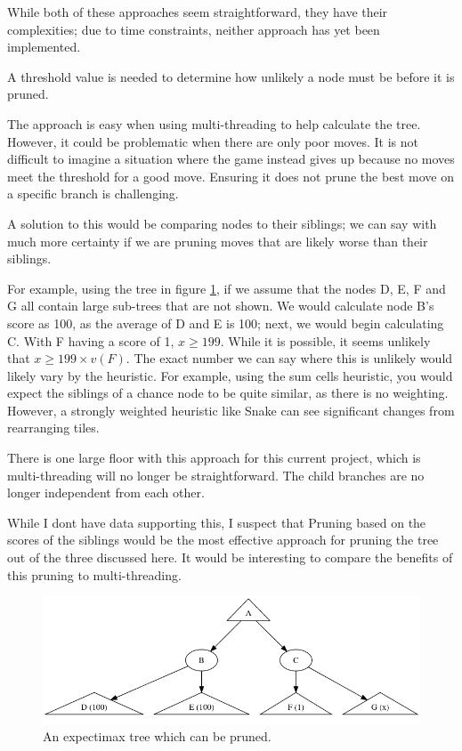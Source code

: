 \documentclass{article}
\begin{document}
While both of these approaches seem straightforward, they have their complexities; due to time constraints, neither approach has yet been implemented.

A threshold value is needed to determine how unlikely a node must be before it is pruned.

The approach is easy when using multi-threading to help calculate the tree. However, it could be problematic when there are only poor moves. It is not difficult to imagine a situation where the game instead gives up because no moves meet the threshold for a good move. Ensuring it does not prune the best move on a specific branch is challenging.

A solution to this would be comparing nodes to their siblings; we can say with much more certainty if we are pruning moves that are likely worse than their siblings.

For example, using the tree in figure \ref{fig:prunepmoves}, if we assume that the nodes D, E, F and G all contain large sub-trees that are not shown. We would calculate node B's score as 100, as the average of D and E is 100; next, we would begin calculating C. With F having a score of 1, $x \ge 199$. While it is possible, it seems unlikely that $x \ge 199 \times v(F)$. The exact number we can say where this is unlikely would likely vary by the heuristic. For example, using the sum cells heuristic, you would expect the siblings of a chance node to be quite similar, as there is no weighting. However, a strongly weighted heuristic like Snake can see significant changes from rearranging tiles.

There is one large floor with this approach for this current project, which is multi-threading will no longer be straightforward. The child branches are no longer independent from each other.

While I don\textquotesingle t have data supporting this, I suspect that Pruning based on the scores of the siblings would be the most effective approach for pruning the tree out of the three discussed here. It would be interesting to compare the benefits of this pruning to multi-threading.

\begin{landscape}
    \begin{figure}
    \centering
    \includegraphics[width=1.5\textwidth]{pruningExample.png}
    \caption{An expectimax tree which can be pruned.}
    \label{fig:prunepmoves}
\end{figure}
\end{landscape}
\end{document}
